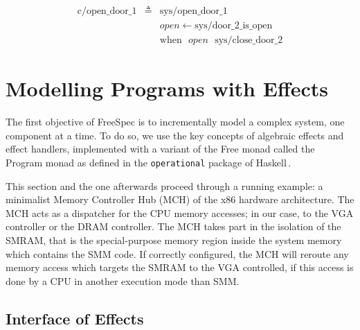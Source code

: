 \[
  \begin{array}{rcl}
    \mathrm{c/open\_door\_1}
    & \triangleq
    & \mathrm{sys/open\_door\_1} \\

    &
    & \mathit{open} \leftarrow \mathrm{sys/door\_2\_is\_open} \\

    &
    & \mathrm{when} \text{ } \mathit{open} \text{ } \mathrm{sys/close\_door\_2}
  \end{array}
\]

\section{Modelling Programs with Effects}
\label{sec:freespec:specifying}

The first objective of FreeSpec is to incrementally model a complex system, one
component at a time.
%
To do so, we use the key concepts of algebraic effects and effect handlers,
implemented with a variant of the Free monad called the Program monad as defined
in the \texttt{operational} package of Haskell\,\cite{operational}.

This section and the one afterwards proceed through a running example: a
minimalist Memory Controller Hub (MCH) of the x86 hardware architecture.
%
The MCH acts as a dispatcher for the CPU memory accesses; in our case, to the
VGA controller or the DRAM controller.
%
The MCH takes part in the isolation of the SMRAM, that is the special-purpose
memory region inside the system memory which contains the SMM code.
%
If correctly configured, the MCH will reroute any memory access which targets
the SMRAM to the VGA controlled, if this access is done by a CPU in another
execution mode than SMM.

%

\subsection{Interface of Effects}

